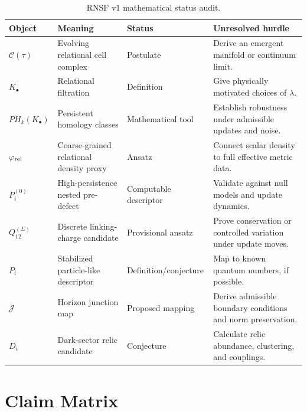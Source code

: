 \documentclass[11pt]{article}
\newcommand{\Ccal}{\mathcal{C}}
\newcommand{\Jmap}{\mathcal{J}}
\newcommand{\Pre}{P_i^{(0)}}
\newcommand{\Pfull}{P_i}
\newcommand{\Qlink}{Q_{12}^{(\Sigma)}}
\begin{document}
\begin{table}[h]
\caption{RNSF v1 mathematical status audit.}
\label{tab:audit}
\small
\begin{tabular}{p{}p{}p{}p{}}
\toprule
\textbf{Object} & \textbf{Meaning} & \textbf{Status} & \textbf{Unresolved hurdle} \\
\midrule
\(\Ccal(\tau)\) & Evolving relational cell complex & Postulate & Derive an emergent manifold or continuum limit. \\
\(K_\bullet\) & Relational filtration & Definition & Give physically motivated choices of \(\lambda\). \\
\(PH_k(K_\bullet)\) & Persistent homology classes & Mathematical tool & Establish robustness under admissible updates and noise. \\
\(\varphi_{\rm rel}\) & Coarse-grained relational density proxy & Ansatz & Connect scalar density to full effective metric data. \\
\(\Pre\) & High-persistence nested pre-defect & Computable descriptor & Validate against null models and update dynamics. \\
\(\Qlink\) & Discrete linking-charge candidate & Provisional ansatz & Prove conservation or controlled variation under update moves. \\
\(\Pfull\) & Stabilized particle-like descriptor & Definition/conjecture & Map to known quantum numbers, if possible. \\
\(\Jmap\) & Horizon junction map & Proposed mapping & Derive admissible boundary conditions and norm preservation. \\
\(D_i\) & Dark-sector relic candidate & Conjecture & Calculate relic abundance, clustering, and couplings. \\
\bottomrule
\end{tabular}
\end{table}

\section{Claim Matrix}
\label{app:claim-matrix}
\end{document}
